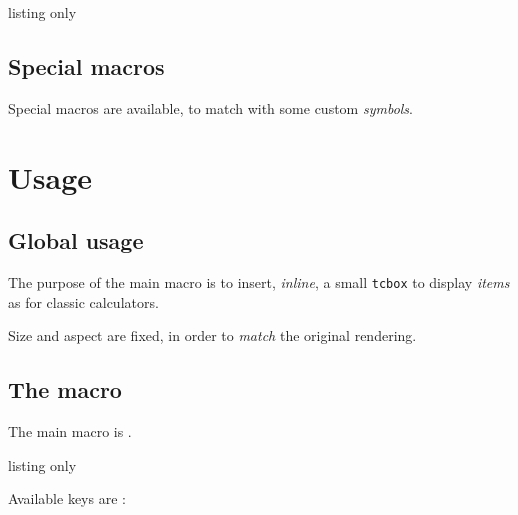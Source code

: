 \documentclass[11pt,a4paper]{ltxdoc}
\begin{document}
\begin{DemoCode}{listing only}
\newfontfamily{} %
\newfontfamily{} %
\newfontfamily{} %
\newfontfamily{} %
\newfontfamily{} %
\end{DemoCode}

\subsection{Special macros}

Special macros are available, to match with some custom \textit{symbols}.

\begin{DemoCode}{}
\nwkstri \qquad \tidots  \qquad \casiodots
\end{DemoCode}

\section{Usage}

\subsection{Global usage}

The purpose of the main macro is to insert, \textit{inline}, a small \texttt{tcbox} to display \textit{items} as for classic calculators.

Size and aspect are fixed, in order to \textit{match} the original rendering.

\subsection{The macro}

The main macro is \ShowCode{\\CalcItemMenu}.

\begin{DemoCode}{listing only}
\end{DemoCode}

Available keys are :
\end{document}

